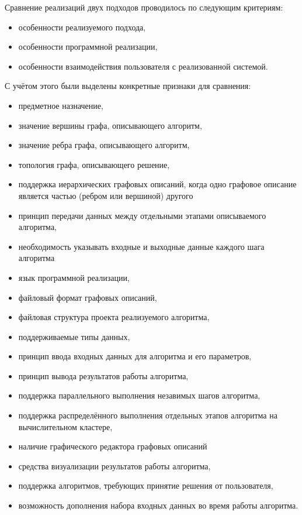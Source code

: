 Сравнение реализаций двух подходов проводилось по следующим критериям:
\begin{itemize}
  \item особенности реализуемого подхода,
  \item особенности программной реализации,
  \item особенности взаимодействия пользователя с реализованной системой.
\end{itemize}
С учётом этого были выделены конкретные признаки для сравнения:
\begin{itemize}
  \item предметное назначение,
  \item значение вершины графа, описывающего алгоритм,
  \item значение ребра графа, описывающего алгоритм,
  \item топология графа, описывающего решение,
  \item поддержка иерархических графовых описаний, когда одно графовое описание является частью (ребром или вершиной) другого
  \item принцип передачи данных между отдельными этапами описываемого алгоритма,
  \item необходимость указывать входные и выходные данные каждого шага алгоритма
  \item язык программной реализации,
  \item файловый формат графовых описаний,
  \item файловая структура проекта реализуемого алгоритма,
  \item поддерживаемые типы данных,
  \item принцип ввода входных данных для алгоритма и его параметров,
  \item принцип вывода результатов работы алгоритма,
  \item поддержка параллельного выполнения незавимых шагов алгоритма,
  \item поддержка распределённого выполнения отдельных этапов алгоритма на вычислительном кластере,
  \item наличие графического редактора графовых описаний
  \item средства визуализации результатов работы алгоритма,
  \item поддержка алгоритмов, требующих принятие решения от пользователя,
  \item возможность дополнения набора входных данных во время работы алгоритма.
\end{itemize}

